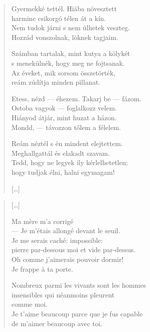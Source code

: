 \documentclass[11pt]{book}
\newcommand*{\centeredornament}{\centerline{\pgfornament[width=6cm]{88}}}
\begin{document}
\begin{verse}
  Gyermekké tettél. Hiába növesztett \\
  harminc csikorgó télen át a kín. \\
  Nem tudok járni s nem ülhetek veszteg. \\
  Hozzád vonszolnak, löknek tagjaim.

  Számban tartalak, mint kutya a kölykét \\
  s menekülnék, hogy meg ne fojtsanak. \\
  Az éveket, mik sorsom összetörték, \\
  reám zúdítja minden pillanat.

  Etess, nézd --- éhezem. Takarj be --- fázom. \\
  Ostoba vagyok --- foglalkozz velem. \\
  Hiányod átjár, mint huzat a házon. \\
  Mondd, --- távozzon tőlem a félelem.

  Reám néztél s én mindent elejtettem. \\
  Meghallgattál és elakadt szavam. \\
  Tedd, hogy ne legyek ily kérlelhetetlen; \\
  hogy tudjak élni, halni egymagam!

  \hfill [\ldots]
\end{verse}

\newpage

\vspace*{-15mm}
\centeredornament


\poemtitle*{\phantom{Tu as fait de moi un enfant}}

\begin{verse}
  \textnormal{[\ldots]}

  Ma mère m'a corrigé \\
  --- Je m'étais allongé devant le seuil. \\
  Je me serais caché: impossible: \\
  pierre par-dessous moi et vide par-dessus. \\
  Oh comme j'aimerais pouvoir dormir! \\
  Je frappe à ta porte.

  Nombreux parmi les vivants sont les hommes \\
  insensibles qui néanmoins pleurent \\
  comme moi. \\
  Je t'aime beaucoup parce que je fus capable \\
  de m'aimer beaucoup avec toi.
\end{verse}
\end{document}
